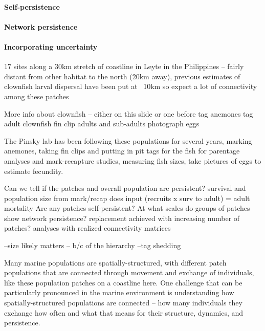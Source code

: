 \documentclass[12pt, oneside]{article}   	%
\begin{document}
\paragraph*{Self-persistence}

\paragraph*{Network persistence}

\paragraph*{Incorporating uncertainty}





17 sites along a 30km stretch of coastline in Leyte in the Philippines – fairly distant from other habitat to the north (20km away), previous estimates of clownfish larval dispersal have been put at ~10km so expect a lot of connectivity among these patches

More info about clownfish – either on this slide or one before
tag anemones
tag adult clownfish
fin clip adults and sub-adults
photograph eggs

The Pinsky lab has been following these populations for several years, marking anemones, taking fin clips and putting in pit tags for the fish for parentage analyses and mark-recapture studies, measuring fish sizes, take pictures of eggs to estimate fecundity. 

Can we tell if the patches and overall population are persistent?
survival and population size from mark/recap
does input (recruits x surv to adult) = adult mortality
Are any patches self-persistent?
At what scales do groups of patches show network persistence?
replacement achieved with increasing number of patches?
analyses with realized connectivity matrices


--size likely matters – b/c of the hierarchy
--tag shedding

Many marine populations are spatially-structured, with different patch populations that are connected through movement and exchange of individuals, like these population patches on a coastline here. One challenge that can be particularly pronounced in the marine environment is understanding how spatially-structured populations are connected – how many individuals they exchange how often and what that means for their structure, dynamics, and persistence.
\end{document}
